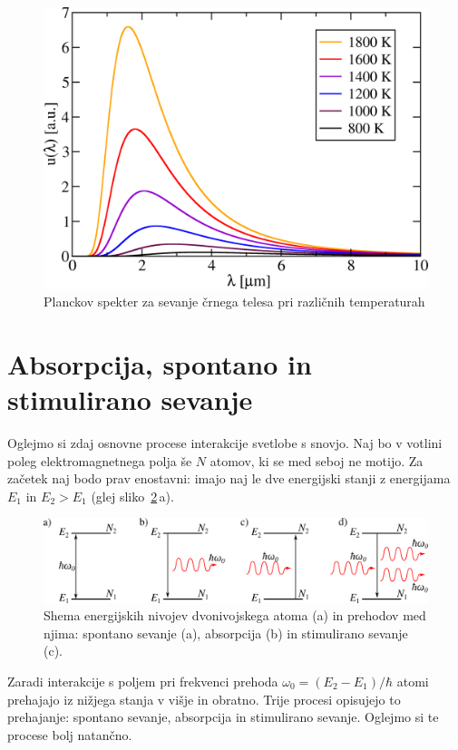 \begin{figure}[h]
\centering
\includegraphics[width=7truecm]{slike/05_Planck.png}
\caption{Planckov spekter za sevanje črnega telesa pri različnih temperaturah}
\label{fig:Planck}
\end{figure}


\section{Absorpcija, spontano in stimulirano sevanje}

Oglejmo si zdaj osnovne procese interakcije svetlobe s snovjo. Naj
bo v votlini poleg elektromagnetnega polja še $N$ atomov, ki se med
seboj ne motijo. Za začetek naj bodo prav enostavni: 
imajo naj le dve energijski stanji z energijama $E_{1}$ in $E_{2}>E_1$ (glej sliko~\ref{sl4.1}\,a).\\
\begin{figure}[h]
\centering
\includegraphics[width=14truecm]{slike/05_Dvonivojski.png}
\caption{Shema energijskih nivojev dvonivojskega atoma (a) in prehodov med njima:
spontano sevanje (a), absorpcija (b) in stimulirano sevanje (c).}
\label{sl4.1}
\end{figure}

\noindent
Zaradi interakcije s poljem pri frekvenci prehoda $\omega_{0}=(E_{2}-E_{1})/\hbar$
atomi prehajajo iz nižjega stanja v višje in obratno. Trije procesi opisujejo to 
prehajanje: spontano sevanje, absorpcija in stimulirano sevanje. Oglejmo si te procese
bolj natančno.

